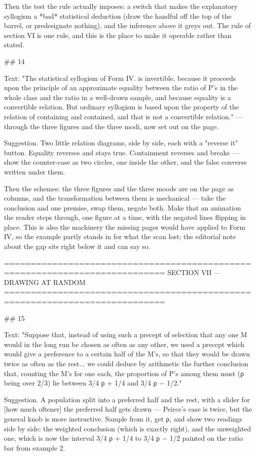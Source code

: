Then the test the rule actually imposes: a switch that makes the explanatory
syllogism a *bad* statistical deduction (draw the handful off the top of the
barrel, or predesignate nothing), and the inference above it greys out. The rule
of section VI is one rule, and this is the place to make it operable rather than
stated.


## 14

Text: "The statistical syllogism of Form IV. is invertible, because it proceeds
upon the principle of an approximate equality between the ratio of P's in the
whole class and the ratio in a well-drawn sample, and because equality is a
convertible relation. But ordinary syllogism is based upon the property of the
relation of containing and contained, and that is not a convertible relation."
— through the three figures and the three modi, now set out on the page.

Suggestion. Two little relation diagrams, side by side, each with a "reverse it"
button. Equality reverses and stays true. Containment reverses and breaks —
show the counter-case as two circles, one inside the other, and the false
converse written under them.

Then the schemes: the three figures and the three moods are on the page as
columns, and the transformation between them is mechanical — take the
conclusion and one premise, swap them, negate both. Make that an animation the
reader steps through, one figure at a time, with the negated lines flipping in
place. This is also the machinery the missing pages would have applied to
Form IV, so the example partly stands in for what the scan lost; the editorial
note about the gap sits right below it and can say so.


============================================================================
SECTION VII — DRAWING AT RANDOM
============================================================================

## 15

Text: "Suppose that, instead of using such a precept of selection that any one M
would in the long run be chosen as often as any other, we used a precept which
would give a preference to a certain half of the M's, so that they would be
drawn twice as often as the rest... we could deduce by arithmetic the further
conclusion that, counting the M's for one each, the proportion of P's among them
must (ρ being over 2/3) lie between 3/4 ρ + 1/4 and 3/4 ρ − 1/2."

Suggestion. A population split into a preferred half and the rest, with a slider
for [how much oftener] the preferred half gets drawn — Peirce's case is twice,
but the general knob is more instructive. Sample from it, get ρ, and show two
readings side by side: the weighted conclusion (which is exactly right), and the
unweighted one, which is now the interval 3/4 ρ + 1/4 to 3/4 ρ − 1/2 painted on
the ratio bar from example 2.

